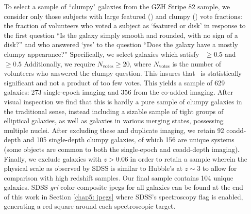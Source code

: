 To select a sample of ``clumpy" galaxies from the GZH Stripe 82 sample, we consider only those subjects with large featured (\ffeat) and clumpy (\fclump) vote fractions: the fraction of volunteers who voted a subject as `featured or disk' in response to the first question ``Is the galaxy simply smooth and rounded, with no sign of a disk?'' and who answered `yes' to the question ``Does the galaxy have a mostly clumpy appearance?'' Specifically, we select galaxies which satisfy \ffeat~$\ge0.5$ and \fclump~$\ge0.5$ Additionally, we require $N_{\mathrm{votes}} \ge 20$, where $N_{\mathrm{votes}}$ is the number of volunteers who answered the clumpy question. This insures that \fclump~is statistically significant and not a product of too few votes.  This yields a sample of 629 galaxies: 273 single-epoch imaging and 356 from the co-added imaging. After visual inspection we find that this is hardly a pure sample of clumpy galaxies in the traditional sense, instead including a sizable sample of tight groups of elliptical galaxies, as well as galaxies in various merging states, possessing multiple nuclei. After excluding these and duplicate imaging, we retain 92 coadd-depth and 105 single-depth clumpy galaxies, of which 156 are unique systems (some objects are common to both the single-epoch and coadd-depth imaging). Finally, we exclude galaxies with $z>0.06$ in order to retain a sample wherein the physical scale as observed by SDSS is similar to Hubble's at $z\sim3$ to allow for comparison with high redshift samples. Our final sample contains 104 unique galaxies. SDSS \textit{gri} color-composite jpegs for all galaxies can be found at the end of this work in Section \ref{chap5: jpegs} where SDSS's spectroscopy flag is enabled, generating a red square around each spectroscopic target.  

